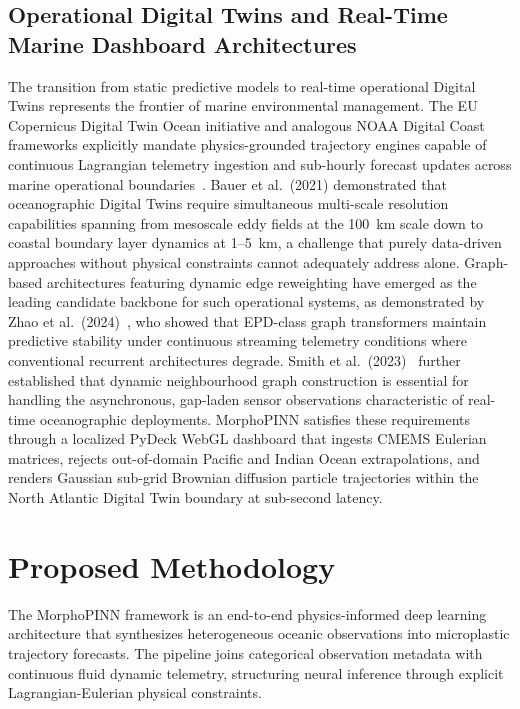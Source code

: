 \documentclass[conference]{IEEEtran}
\begin{document}
\subsection{Operational Digital Twins and Real-Time Marine Dashboard Architectures}
The transition from static predictive models to real-time operational Digital Twins represents the frontier of marine environmental management. The EU Copernicus Digital Twin Ocean initiative and analogous NOAA Digital Coast frameworks explicitly mandate physics-grounded trajectory engines capable of continuous Lagrangian telemetry ingestion and sub-hourly forecast updates across marine operational boundaries~\cite{ref43}. Bauer et al.\ (2021) demonstrated that oceanographic Digital Twins require simultaneous multi-scale resolution capabilities spanning from mesoscale eddy fields at the 100~km scale down to coastal boundary layer dynamics at 1--5~km, a challenge that purely data-driven approaches without physical constraints cannot adequately address alone. Graph-based architectures featuring dynamic edge reweighting have emerged as the leading candidate backbone for such operational systems, as demonstrated by Zhao et al.\ (2024)~\cite{ref23}, who showed that EPD-class graph transformers maintain predictive stability under continuous streaming telemetry conditions where conventional recurrent architectures degrade. Smith et al.\ (2023)~\cite{ref37} further established that dynamic neighbourhood graph construction is essential for handling the asynchronous, gap-laden sensor observations characteristic of real-time oceanographic deployments. MorphoPINN satisfies these requirements through a localized PyDeck WebGL dashboard that ingests CMEMS Eulerian matrices, rejects out-of-domain Pacific and Indian Ocean extrapolations, and renders Gaussian sub-grid Brownian diffusion particle trajectories within the North Atlantic Digital Twin boundary at sub-second latency.


\section{Proposed Methodology}

The MorphoPINN framework is an end-to-end physics-informed deep learning architecture that synthesizes heterogeneous oceanic observations into microplastic trajectory forecasts. The pipeline joins categorical observation metadata with continuous fluid dynamic telemetry, structuring neural inference through explicit Lagrangian-Eulerian physical constraints.
\end{document}
